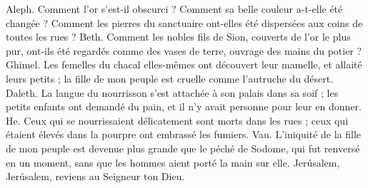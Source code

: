 Aleph. Comment l'or s'est-il obscurci ? Comment sa belle couleur a-t-elle été changée ? Comment les pierres du sanctuaire ont-elles été dispersées aux coins de toutes les rues ?
\versseparator
Beth. Comment les nobles fils de Sion, couverts de l'or le plus pur, ont-ils été regardés comme des vases de terre, ouvrage des mains du potier ?
\versseparator
Ghimel. Les femelles du chacal elles-mêmes ont découvert leur mamelle, et allaité leurs petits ; la fille de mon peuple est cruelle comme l'autruche du désert.
\versseparator
Daleth. La langue du nourrisson s'est attachée à son palais dans sa soif ; les petits enfants ont demandé du pain, et il n'y avait personne pour leur en donner.
\versseparator
He. Ceux qui se nourrissaient délicatement sont morts dans les rues ; ceux qui étaient élevés dans la pourpre ont embrassé les fumiers.
\versseparator
Vau. L'iniquité de la fille de mon peuple est devenue plus grande que le péché de Sodome, qui fut renversé en un moment, sans que les hommes aient porté la main sur elle.
\versseparator
Jerúsalem, Jerúsalem, reviens au Seigneur ton Dieu.